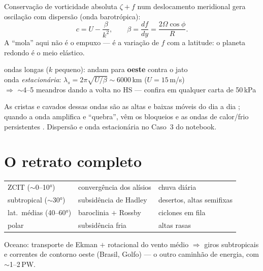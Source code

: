 \documentclass[11pt]{article}
\begin{document}

\begin{formadif}
Conservação de vorticidade absoluta $\zeta + f$ num deslocamento
meridional gera oscilação com dispersão (onda barotrópica):
\[ c = U - \frac{\beta}{k^2},\qquad
   \beta = \frac{df}{dy} = \frac{2\Omega\cos\phi}{R}. \]
A ``mola'' aqui não é o empuxo  — é a
variação de $f$ com a latitude: o planeta redondo é o meio elástico.
\end{formadif}

\begin{noquadro}
ondas longas ($k$ pequeno): andam para \textbf{oeste} contra o jato\\
onda \emph{estacionária}: $\lambda_s = 2\pi\sqrt{U/\beta} \sim 6000$\,km
($U = 15$\,m/s)\\[2pt]
$\Rightarrow$ $\sim$4--5 meandros dando a volta no HS — confira em
qualquer carta de 50\,kPa 
\end{noquadro}

As cristas e cavados dessas ondas são as altas e baixas móveis do dia a
dia ; quando a onda amplifica e
``quebra'', vêm os bloqueios e as ondas de calor/frio persistentes
. Dispersão e onda estacionária no
Caso~3 do notebook.

\section{O retrato completo}

\begin{noquadro}
\begin{tabular}{lll}
ZCIT ($\sim$0--10°) & convergência dos alísios & chuva diária \\
subtropical ($\sim$30°) & subsidência de Hadley & desertos, altas
semifixas \\
lat.\ médias (40--60°) & baroclinia $+$ Rossby & ciclones em fila \\
polar & subsidência fria & altas rasas \\
\end{tabular}
\end{noquadro}

Oceano: transporte de Ekman  $+$ rotacional do vento
médio $\Rightarrow$ giros subtropicais e correntes de contorno oeste
(Brasil, Golfo) — o outro caminhão de energia, com $\sim$1--2\,PW.
\end{document}
